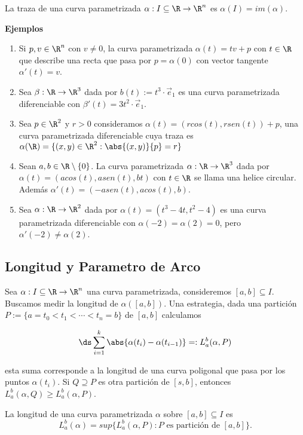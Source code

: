 \documentclass{article}
\begin{document}
\begin{dfn}
    La traza de una curva parametrizada $\alpha:I\subseteq\R\to\R^{n}$ es $\alpha(I)=im(\alpha)$.
\end{dfn}

\noindent\textbf{Ejemplos}
\begin{enumerate}
    \item Si $p,v\in\R^{n}$ con $v\neq0$, la curva parametrizada $\alpha(t)=tv+p$ con $t\in\R$ 
    que describe una recta que pasa por $p=\alpha(0)$ con vector tangente $\alpha'(t)=v$.
    \item Sea $\beta:\R\to\R^{3}$ dada por $b(t):=t^{3}\cdot\overrightarrow{e}_{1}$ es una curva
    parametrizada diferenciable con $\beta'(t)=3t^{2}\cdot\overrightarrow{e}_{1}$.
    \item Sea $p\in\R^{2}$ y $r>0$ consideramos $\alpha(t)=(rcos(t),rsen(t))+p$, una curva
    parametrizada diferenciable cuya traza es $\alpha(\R)=\{(x,y)\in\R^{2}:\abs{(x,y)}{p}=r\}$
    \item Sean $a,b\in\R\setminus{\{0\}}$. La curva parametrizada $\alpha:\R\to\R^{3}$ dada por
    $\alpha(t)=(acos(t),asen(t),bt)$ con $t\in\R$ se llama una helice circular. 
    Además $\alpha'(t)=(-asen(t),acos(t),b)$.
    \item Sea $\alpha:\R\to\R^{2}$ dada por $\alpha(t)=(t^{3}-4t,t^{2}-4)$ es una curva 
    parametrizada diferenciable con $\alpha(-2)=\alpha(2)=0$, pero $\alpha'(-2)\neq\alpha(2)$.
\end{enumerate}

\subsection{Longitud y Parametro de Arco}
\noindent Sea $\alpha:I\subseteq\R\to\R^{n}$ una curva parametrizada, consideremos $[a,b]\subseteq I$.
Buscamos medir la longitud de $\alpha([a,b])$. Una estrategia, dada una partición $P:=\{a=t_{0}
<t_{1}<\cdots<t_{n}=b\}$ de $[a,b]$ calculamos

\begin{equation*}
    \ds\sum_{i=1}^{k}\abs{\alpha(t_{i})-\alpha(t_{i-1})}=:L_{a}^{b}(\alpha,P)
\end{equation*}

\noindent esta suma corresponde a la longitud de una curva poligonal que pasa por los puntos 
$\alpha(t_{i})$. Si $Q\supseteq P$ es otra partición de $[s,b]$, entonces 
$L_{a}^{b}(\alpha,Q)\geq L_{a}^{b}(\alpha,P)$.

\begin{dfn}
    La longitud de una curva parametrizada $\alpha$ sobre $[a,b]\subseteq I$ es
    \begin{equation*}
        L_{a}^{b}(\alpha)=sup\{L_{a}^{b}(\alpha,P):P\text{ es partición de }[a,b]\}.
    \end{equation*}
\end{dfn}
\end{document}
